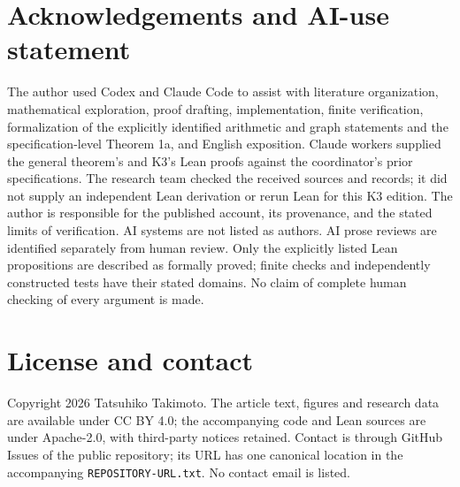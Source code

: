 \documentclass[11pt]{amsart}
\newcommand{\record}[1]{\nolinkurl{#1}}
\theoremstyle{definition}\newtheorem{definition}{Definition}
\begin{document}
\section*{Acknowledgements and AI-use statement}
The author used Codex and Claude Code
to assist with literature organization, mathematical exploration,
proof drafting, implementation, finite verification, formalization of
the explicitly identified arithmetic and graph statements and the
specification-level Theorem 1a, and English exposition. Claude workers
supplied the general theorem's and K3's Lean proofs against the
coordinator's prior specifications. The research team checked the
received sources and records; it did not supply an independent Lean
derivation or rerun Lean for this K3 edition. The author is responsible
for the published account, its provenance, and the stated limits of
verification. AI systems are not listed as authors. AI prose reviews
are identified separately from human review. Only the explicitly
listed Lean propositions are described as formally proved; finite
checks and independently constructed tests have their stated domains.
No claim of complete human checking of every argument is made.

\section*{License and contact}
Copyright 2026 Tatsuhiko Takimoto. The article text, figures and research
data are available under CC BY 4.0; the accompanying code and Lean
sources are under Apache-2.0, with third-party notices retained.
Contact is through GitHub Issues of the public repository; its URL
has one canonical location in the accompanying
\record{REPOSITORY-URL.txt}. No contact email is listed.
\end{document}
